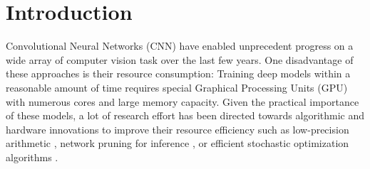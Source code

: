 \documentclass[twocolumn]{bmcart}
\begin{document}
\begin{frontmatter}
\begin{fmbox}
\begin{abstractbox}

\begin{keyword}
\end{keyword}


\end{abstractbox}
\end{fmbox}%
\end{frontmatter}




\section{Introduction}
Convolutional Neural Networks (CNN) have enabled unprecedent progress on a wide array of computer vision task over the last few years.
One disadvantage of these approaches is their resource consumption: 
Training deep models within a reasonable amount of time requires special
Graphical Processing Units (GPU) with numerous cores and large memory capacity.
Given the practical importance of these models, a lot of research effort has been directed
towards algorithmic and hardware innovations to improve their resource efficiency such as low-precision arithmetic \cite{jacob2018quantization}, network pruning for inference \cite{molchanov2016pruning}, or efficient stochastic optimization algorithms \cite{kingma2014adam}.
\end{document}
